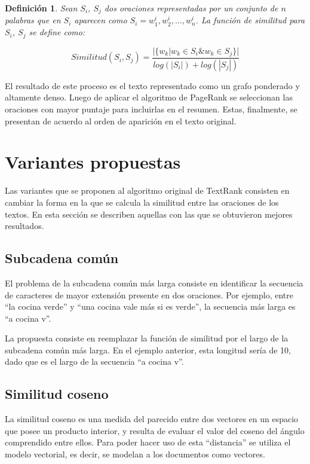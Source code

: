 \documentclass{llncs}
\newtheorem{definicion}{Definición}
\begin{document}
\begin{definicion}
Sean $S_i$, $S_j$ dos oraciones representadas por un conjunto de $n$ palabras que en 
$S_i$ aparecen como $S_i = w_{1}^{i}, w_{2}^{i},..., w_{n}^{i}$. La función de similitud para $S_i$, $S_j$ se define como:

\begin{equation}
Similitud(S_{i},S_{j}) = \frac{ | \{   w_{k} | w_{k} \in S_{i} \& w_{k} \in S_{j}   \}  | }    
                              {  log(|S_{i}|) + log(|S_{j}|)  }
\end{equation}


\end{definicion}
    
El resultado de este proceso es el texto representado como un grafo ponderado y altamente denso. Luego de aplicar el algoritmo de PageRank se seleccionan las oraciones con mayor puntaje para incluirlas en el resumen. Estas, finalmente, se presentan de acuerdo al orden de aparición en el texto original.


\section{Variantes propuestas}

Las variantes que se proponen al algoritmo original de TextRank consisten en cambiar la forma en la que se calcula la similitud entre las oraciones de los textos. En esta sección se describen aquellas con las que se obtuvieron mejores resultados. 


\subsection{Subcadena común}
El problema de la subcadena común más larga consiste en identificar la secuencia de caracteres de mayor extensión presente en dos oraciones. Por ejemplo, entre “la cocina verde” y “una cocina vale más si es verde”, la secuencia más larga es “a cocina v”.

La propuesta consiste en reemplazar la función de similitud por el largo de la subcadena común más larga. En el ejemplo anterior, esta longitud sería de 10, dado que es el largo de la secuencia “a cocina v”.


\subsection{Similitud coseno}
La similitud coseno es una medida del parecido entre dos vectores en un espacio que posee un producto interior, y resulta de evaluar el valor del coseno del ángulo comprendido entre ellos. Para poder hacer uso de esta “distancia” se utiliza el modelo vectorial, es decir, se modelan a los documentos como vectores.
\end{document}

